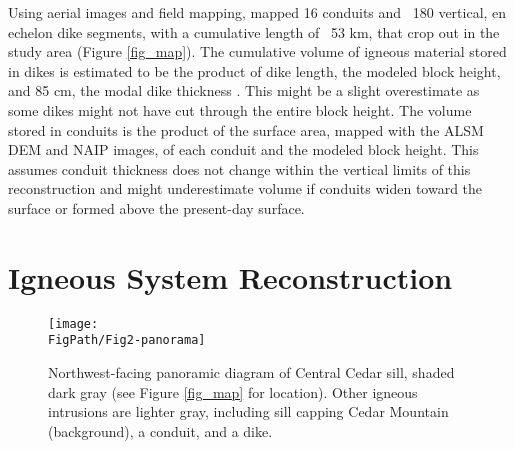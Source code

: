 Using aerial images and field mapping, \citet{kiyosugi2012relationship} mapped 16 conduits and ~180 vertical, en echelon dike segments, with a cumulative length of ~53 km, that crop out in the study area (Figure \ref{fig_map}). The cumulative volume of igneous material stored in dikes is estimated to be the product of dike length, the modeled block height, and 85 cm, the modal dike thickness \citep{delaney1997physical}. This might be a slight overestimate as some dikes might not have cut through the entire block height. The volume stored in conduits is the product of the surface area, mapped with the ALSM DEM and NAIP images, of each conduit and the modeled block height. This assumes conduit thickness does not change within the vertical limits of this reconstruction and might underestimate volume if conduits widen toward the surface or formed above the present-day surface.

\section{Igneous System Reconstruction}

\begin{figure}
\centering
\texttt{[image: \\FigPath/Fig2-panorama]}
\caption[Northwest-facing panoramic diagram of Central Cedar sill, shaded dark gray (see Figure \ref{fig_map} for location)]{Northwest-facing panoramic diagram of Central Cedar sill, shaded dark gray (see Figure \ref{fig_map} for location). Other igneous intrusions are lighter gray, including sill capping Cedar Mountain (background), a conduit, and a dike.}
\label{fig_panorama}
\end{figure}

